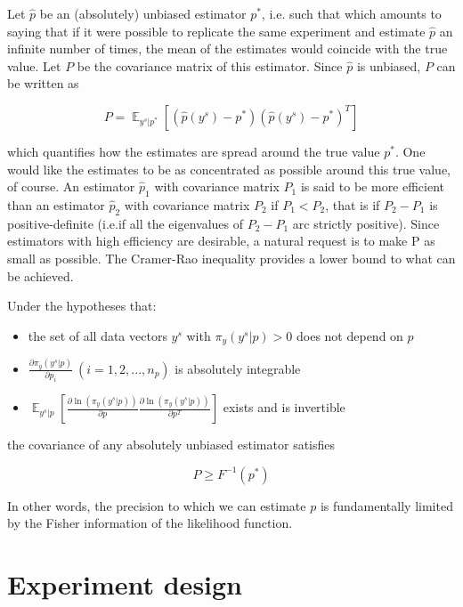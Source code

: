 \documentclass[]{scrartcl}
\begin{document}
Let $\hat{p}$ be an (absolutely) unbiased estimator $p^*$, i.e. such that which amounts to saying that if it were possible to replicate the same experiment and
estimate $\hat{p}$ an infinite number of times, the mean of the estimates would coincide with the true value. Let $P$ be the covariance matrix of this estimator. Since $\hat{p}$ is unbiased, $P$ can be written as

\begin{equation}
	P = \mathop{\mathbb{E}}_{y^s|p^*} \left[ \left( \hat{p}(y^s) - p^* \right) \left( \hat{p}(y^s) - p^* \right)^T \right]
\end{equation}

which quantifies how the estimates are spread around the true value $p^*$. One would like the estimates to be as concentrated as possible around this true value, of course. An estimator $\hat{p}_1$ with covariance matrix $P_1$ is said to be more efficient than an estimator $\hat{p}_2$ with covariance matrix $P_2$ if $P_1 < P_2$, that is if $P_2 - P_1$ is positive-definite (i.e.if all the eigenvalues of $P_2-P_1$ arc strictly positive). Since estimators with high efficiency are desirable, a natural request is to make P as small as possible. The Cramer-Rao inequality provides a lower bound to what can be achieved.

Under the hypotheses that:

\begin{itemize}
	\item the set of all data vectors $y^s$ with $\pi_y(y^s|p) > 0$ does not depend on $p$
	\item $\frac{\partial \pi_y(y^s|p)}{\partial p_i}~\left(i=1,2,...,n_p\right)$ is absolutely integrable
	\item $\mathop{\mathbb{E}}_{y^s|p} \left[ \frac{\partial \ln (\pi_y (y^s|p))}{\partial p} \frac{\partial \ln (\pi_y (y^s|p))}{\partial p^T} \right]$ exists and is invertible
\end{itemize}

the covariance of any absolutely unbiased estimator satisfies

\begin{equation}
	P \geq F^{-1}(p^*)
\end{equation}

In other words, the precision to which we can estimate $p$ is fundamentally limited by the Fisher information of the likelihood function.

\section{Experiment design}
\end{document}
